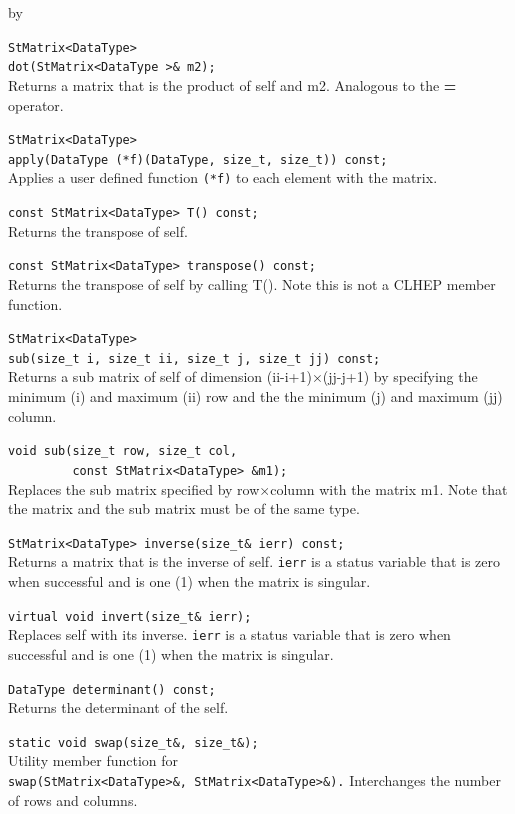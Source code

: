 \documentclass[twoside]{article}
\newcommand{\comp}[1]{\texttt{#1}}%
\newcommand{\entrylabel}[1]{\mbox{\textbf{{#1}}}\hfil}%
\newenvironment{entry}
{\begin{list}{}%
    {\renewcommand{\makelabel}{\entrylabel}%
     \setlength{\labelwidth}{90pt}%
     \setlength{\leftmargin}{\labelwidth}
     \advance\leftmargin by \labelsep%
      }%
    }%
  {\end{list}}
\newcommand{\Entrylabel}[1]%
{\raisebox{0pt}[1ex][0pt]{\makebox[\labelwidth][l]%
    {\parbox[t]{\labelwidth}{\hspace{0pt}\textbf{{#1}}}}}}
\newenvironment{Entry}%
{\renewcommand{\entrylabel}{\Entrylabel}\begin{entry}}%
  {\end{entry}}
\begin{document}
\begin{description}
\begin{Entry}
  \verb+StMatrix<DataType>+\\
  \verb+dot(StMatrix<DataType >& m2);+\\
  Returns a matrix that is the product of self and m2.  Analogous to
  the {\bf *=} operator.
  
  \verb+StMatrix<DataType>+\\
  \verb+apply(DataType (*f)(DataType, size_t, size_t)) const;+\\
  Applies a user defined function \comp{(*f)} to each element with the
  matrix.
  
  \verb+const StMatrix<DataType> T() const;+\\
  Returns the transpose of self.

  \verb+const StMatrix<DataType> transpose() const;+\\
  Returns the transpose of self by calling T().  Note this
  is not a CLHEP member function.

  \verb+StMatrix<DataType>+\\
  \verb+sub(size_t i, size_t ii, size_t j, size_t jj) const;+\\
  Returns a sub matrix of self of dimension (ii-i+1)$\times$(jj-j+1) by
  specifying the minimum (i) and maximum (ii) row and the the minimum (j)
  and maximum (jj) column.

  \verb+void sub(size_t row, size_t col,+\\
  \verb+         const StMatrix<DataType> &m1);+\\
  Replaces the sub matrix specified by row$\times$column with
  the matrix m1.  Note that the matrix and the sub matrix must
  be of the same type.
  
  \verb+StMatrix<DataType> inverse(size_t& ierr) const;+\\
  Returns a matrix that is the inverse of self.  \comp{ierr}
  is a status variable that is zero when successful and is
  one (1) when the matrix is singular.
    
  \verb+virtual void invert(size_t& ierr);+\\
  Replaces self with its inverse.  \comp{ierr}
  is a status variable that is zero when successful and is
  one (1) when the matrix is singular.

  \verb+DataType determinant() const;+\\
  Returns the determinant of the self.

  \verb+static void swap(size_t&, size_t&);+\\
  Utility member function for \\
  \verb+swap(StMatrix<DataType>&, StMatrix<DataType>&).+
  Interchanges the number of rows and columns.
  

\end{Entry}
\end{description}
\end{document}
